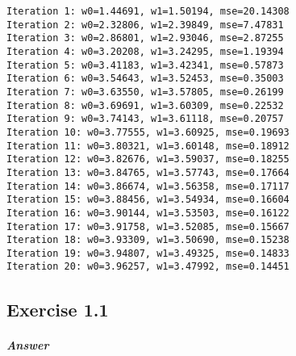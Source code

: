 \documentclass[11pt]{article}
\begin{document}
    \begin{Verbatim}[commandchars=\\\{\}]
Iteration 1: w0=1.44691, w1=1.50194, mse=20.14308
Iteration 2: w0=2.32806, w1=2.39849, mse=7.47831
Iteration 3: w0=2.86801, w1=2.93046, mse=2.87255
Iteration 4: w0=3.20208, w1=3.24295, mse=1.19394
Iteration 5: w0=3.41183, w1=3.42341, mse=0.57873
Iteration 6: w0=3.54643, w1=3.52453, mse=0.35003
Iteration 7: w0=3.63550, w1=3.57805, mse=0.26199
Iteration 8: w0=3.69691, w1=3.60309, mse=0.22532
Iteration 9: w0=3.74143, w1=3.61118, mse=0.20757
Iteration 10: w0=3.77555, w1=3.60925, mse=0.19693
Iteration 11: w0=3.80321, w1=3.60148, mse=0.18912
Iteration 12: w0=3.82676, w1=3.59037, mse=0.18255
Iteration 13: w0=3.84765, w1=3.57743, mse=0.17664
Iteration 14: w0=3.86674, w1=3.56358, mse=0.17117
Iteration 15: w0=3.88456, w1=3.54934, mse=0.16604
Iteration 16: w0=3.90144, w1=3.53503, mse=0.16122
Iteration 17: w0=3.91758, w1=3.52085, mse=0.15667
Iteration 18: w0=3.93309, w1=3.50690, mse=0.15238
Iteration 19: w0=3.94807, w1=3.49325, mse=0.14833
Iteration 20: w0=3.96257, w1=3.47992, mse=0.14451

    \end{Verbatim}

    \subsection{Exercise 1.1 }\label{exercise-1.1}

    \subparagraph{Answer}\label{answer}
\end{document}
